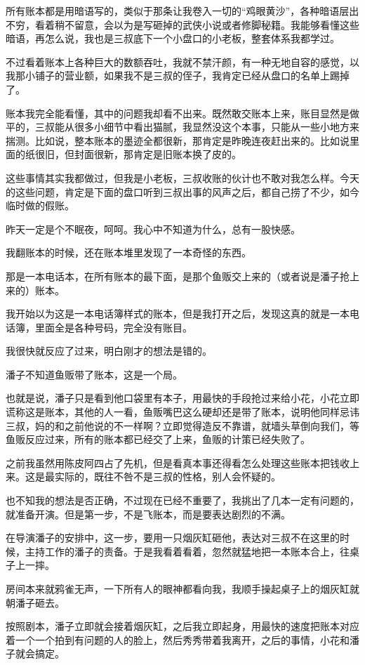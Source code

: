 所有账本都是用暗语写的，类似于那条让我卷入一切的“鸡眼黄沙”，各种暗语层出不穷，看着稍不留意，会以为是写砸掉的武侠小说或者修脚秘籍。我能够看懂这些暗语，再怎么说，我也是三叔底下一个小盘口的小老板，整套体系我都学过。

不过看着账本上各种巨大的数额吞吐，我就不禁汗颜，有一种无地自容的感觉，以我那小铺子的营业额，如果我不是三叔的侄子，我肯定已经从盘口的名单上踢掉了。

账本我完全能看懂，其中的问题我却看不出来。既然敢交账本上来，账目显然是做平的，三叔能从很多小细节中看出猫腻，我显然没这个本事，只能从一些小地方来揣测。比如说，整本账本的墨迹全都很新，那肯定是昨晚连夜赶出来的。比如说里面的纸很旧，但封面很新，那肯定是旧账本换了皮的。

这些事情其实我都做过，但我是小老板，三叔收账的伙计也不敢对我怎么样。今天的这些问题，肯定是下面的盘口听到三叔出事的风声之后，都自己捞了不少，如今临时做的假账。

昨天一定是个不眠夜，呵呵。我心中不知道为什么，总有一股快感。

我翻账本的时候，还在账本堆里发现了一本奇怪的东西。

那是一本电话本，在所有账本的最下面，是那个鱼贩交上来的（或者说是潘子抢上来的）账本。

我开始以为这是一本电话簿样式的账本，但是我打开之后，发现这真的就是一本电话簿，里面全是各种号码，完全没有账目。

我很快就反应了过来，明白刚才的想法是错的。

潘子不知道鱼贩带了账本，这是一个局。

也就是说，潘子只是看到他口袋里有本子，用最快的手段抢过来给小花，小花立即谎称这是账本，其他的人一看，鱼贩嘴巴这么硬却还是带了账本，说明他同样忌讳三叔，妈的和之前他说的不一样啊？立即觉得造反不靠谱，就墙头草倒向我们，等鱼贩反应过来，所有的账本都已经交了上来，鱼贩的计策已经失败了。

之前我虽然用陈皮阿四占了先机，但是看真本事还得看怎么处理这些账本把钱收上来。这是最实际的，既往不咎不是三叔的性格，别人会怀疑的。

也不知我的想法是否正确，不过现在已经不重要了，我挑出了几本一定有问题的，就准备开演。但是第一步，不是飞账本，而是要表达剧烈的不满。

在导演潘子的安排中，这一步，要用一只烟灰缸砸他，表达对三叔不在这里的时候，主持工作的潘子的责备。于是我看着看着，忽然就猛地把一本账本合上，往桌子上一摔。

房间本来就鸦雀无声，一下所有人的眼神都看向我，我顺手操起桌子上的烟灰缸就朝潘子砸去。

按照剧本，潘子立即就会接着烟灰缸，之后我立即起身，用最快的速度把账本对应着一个一个拍到有问题的人的脸上，然后秀秀带着我离开，之后的事情，小花和潘子就会搞定。

